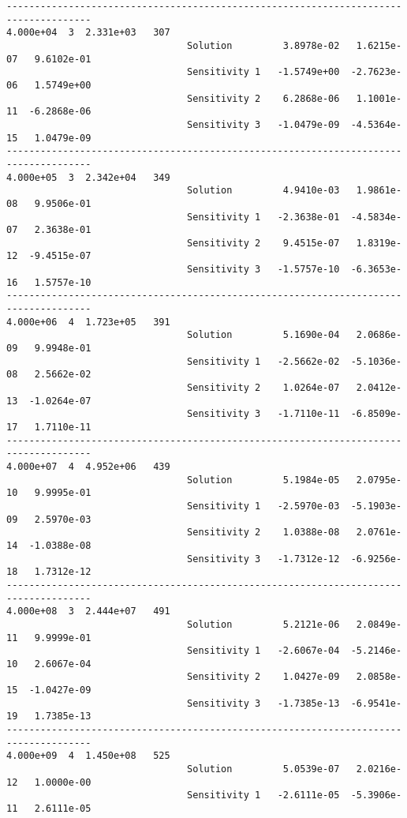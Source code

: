 \begin{verbatim}
-------------------------------------------------------------------------------------
4.000e+04  3  2.331e+03   307
                                Solution         3.8978e-02   1.6215e-07   9.6102e-01 
                                Sensitivity 1   -1.5749e+00  -2.7623e-06   1.5749e+00 
                                Sensitivity 2    6.2868e-06   1.1001e-11  -6.2868e-06 
                                Sensitivity 3   -1.0479e-09  -4.5364e-15   1.0479e-09 
-------------------------------------------------------------------------------------
4.000e+05  3  2.342e+04   349
                                Solution         4.9410e-03   1.9861e-08   9.9506e-01 
                                Sensitivity 1   -2.3638e-01  -4.5834e-07   2.3638e-01 
                                Sensitivity 2    9.4515e-07   1.8319e-12  -9.4515e-07 
                                Sensitivity 3   -1.5757e-10  -6.3653e-16   1.5757e-10 
-------------------------------------------------------------------------------------
4.000e+06  4  1.723e+05   391
                                Solution         5.1690e-04   2.0686e-09   9.9948e-01 
                                Sensitivity 1   -2.5662e-02  -5.1036e-08   2.5662e-02 
                                Sensitivity 2    1.0264e-07   2.0412e-13  -1.0264e-07 
                                Sensitivity 3   -1.7110e-11  -6.8509e-17   1.7110e-11 
-------------------------------------------------------------------------------------
4.000e+07  4  4.952e+06   439
                                Solution         5.1984e-05   2.0795e-10   9.9995e-01 
                                Sensitivity 1   -2.5970e-03  -5.1903e-09   2.5970e-03 
                                Sensitivity 2    1.0388e-08   2.0761e-14  -1.0388e-08 
                                Sensitivity 3   -1.7312e-12  -6.9256e-18   1.7312e-12 
-------------------------------------------------------------------------------------
4.000e+08  3  2.444e+07   491
                                Solution         5.2121e-06   2.0849e-11   9.9999e-01 
                                Sensitivity 1   -2.6067e-04  -5.2146e-10   2.6067e-04 
                                Sensitivity 2    1.0427e-09   2.0858e-15  -1.0427e-09 
                                Sensitivity 3   -1.7385e-13  -6.9541e-19   1.7385e-13 
-------------------------------------------------------------------------------------
4.000e+09  4  1.450e+08   525
                                Solution         5.0539e-07   2.0216e-12   1.0000e-00 
                                Sensitivity 1   -2.6111e-05  -5.3906e-11   2.6111e-05 

\end{verbatim}
